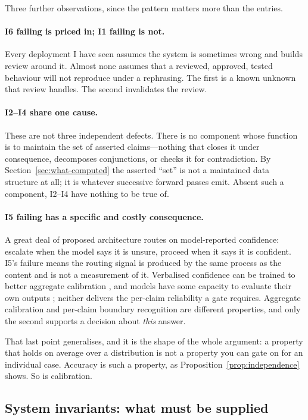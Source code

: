 Three further observations, since the pattern matters more than the entries.

\paragraph{I6 failing is priced in; I1 failing is not.} Every deployment I have
seen assumes the system is sometimes wrong and builds review around it. Almost none
assumes that a reviewed, approved, tested behaviour will not reproduce under a
rephrasing. The first is a known unknown that review handles. The second
invalidates the review.

\paragraph{I2--I4 share one cause.} These are not three independent defects. There
is no component whose function is to maintain the set of asserted claims---nothing
that closes it under consequence, decomposes conjunctions, or checks it for
contradiction. By Section~\ref{sec:what-computed} the asserted ``set'' is not a
maintained data structure at all; it is whatever successive forward passes emit.
Absent such a component, I2--I4 have nothing to be true of.

\paragraph{I5 failing has a specific and costly consequence.} A great deal of
proposed architecture routes on model-reported confidence: escalate when the model
says it is unsure, proceed when it says it is confident. I5's failure means the
routing signal is produced by the same process as the content and is not a
measurement of it. Verbalised confidence can be trained to better aggregate
calibration \citep{lin2022}, and models have some capacity to evaluate their own
outputs \citep{kadavath2022}; neither delivers the per-claim reliability a gate
requires. Aggregate calibration and per-claim boundary recognition are different
properties, and only the second supports a decision about \emph{this} answer.

That last point generalises, and it is the shape of the whole argument: a property
that holds on average over a distribution is not a property you can gate on for an
individual case. Accuracy is such a property, as
Proposition~\ref{prop:independence} shows. So is calibration.

\subsection{System invariants: what must be supplied}

